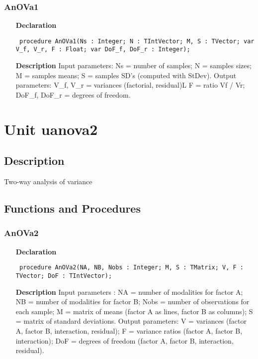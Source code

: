 \documentclass[12pt,a4paper,oneside]{report}
\newcommand{\declarationitem}[1]{\textbf{#1}}
\newcommand{\descriptiontitle}[1]{\textbf{#1}}
\newcommand{\code}[1]{\texttt{#1}}
\begin{document}
\subsubsection{AnOVa1}
\label{uanova1-AnOVa1}
\begin{itemize}\item[\declarationitem{Declaration}\hfill]
	\begin{flushleft}
		\code{
			procedure AnOVa1(Ns : Integer; N : TIntVector; M, S : TVector; var V{\_}f, V{\_}r, F : Float; var DoF{\_}f, DoF{\_}r : Integer);}
	\end{flushleft}
	\item[\descriptiontitle{Description}]
	Input parameters: Ns = number of samples; N = samples sizes; M = samples means; S = samples SD's (computed with StDev). Output parameters: V{\_}f, V{\_}r = variances (factorial, residual)L F = ratio Vf / Vr; DoF{\_}f, DoF{\_}r = degrees of freedom.
\end{itemize}
\section{Unit uanova2}
\label{uanova2}
\subsection{Description}
Two{-}way analysis of variance 
\subsection{Functions and Procedures}
\subsubsection{AnOVa2}
\label{uanova2-AnOVa2}
\begin{itemize}\item[\declarationitem{Declaration}\hfill]
	\begin{flushleft}
		\code{
			procedure AnOVa2(NA, NB, Nobs : Integer; M, S : TMatrix; V, F : TVector; DoF : TIntVector);}
	\end{flushleft}
	\item[\descriptiontitle{Description}]
	Input parameters : NA = number of modalities for factor A; NB = number of modalities for factor B; Nobs = number of observations for each sample; M = matrix of means (factor A as lines, factor B as columns); S = matrix of standard deviations. Output parameters: V = variances (factor A, factor B, interaction, residual); F = variance ratios (factor A, factor B, interaction); DoF = degrees of freedom (factor A, factor B, interaction, residual).
\end{itemize}
\end{document}
